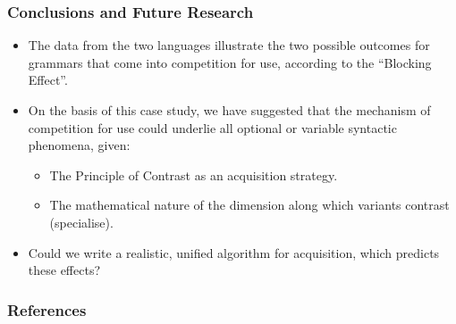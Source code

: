 \documentclass[hyperref={pdfpagelabels=false}]{beamer}
\begin{document}
\begin{frame}
\frametitle{Conclusions and Future Research}
\begin{itemize}
	\item The data from the two languages illustrate the two possible outcomes for grammars that come into competition for use, according to the ``Blocking Effect''.
	\item On the basis of this case study, we have suggested that the mechanism of competition for use could underlie all optional or variable syntactic phenomena, given:
		\begin{itemize}
			\item The Principle of Contrast as an acquisition strategy.
			\item The mathematical nature of the dimension along which variants contrast (specialise).
		\end{itemize}
	\item Could we write a realistic, unified algorithm for acquisition, which predicts these effects? 
\end{itemize}

\end{frame}




\begin{frame}[allowframebreaks]
\frametitle{References}
\newcommand*{\newblock}{natbib}


\end{frame}
\end{document}
